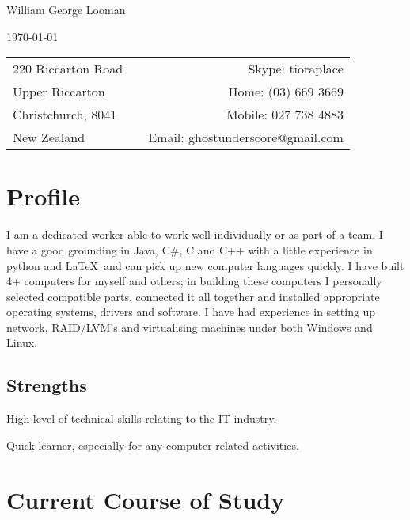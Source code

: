 \documentclass[10pt]{article}
\newenvironment{packed_items}{
    \begin{itemize}
    \setlength{\itemsep}{1pt}
    \setlength{\parskip}{0pt}
    \setlength{\parsep}{0pt}
}{\end{itemize}}
\begin{document}
    \begin{centering}
        {\LARGE William George Looman}
        
        {\today}
        
        {
            \begin{tabularx}{\textwidth}{lXr}
            220 Riccarton Road  &  &                Skype: tioraplace \\
            Upper Riccarton     &  &              Home: (03) 669 3669 \\
            Christchurch, 8041  &  &             Mobile: 027 738 4883 \\
            New Zealand         &  & Email: ghostunderscore@gmail.com \\
            \end{tabularx}
        }
    \end{centering}
    \section*{Profile}\small
    \vspace{-5pt}
        I am a dedicated worker able to work well individually or as part of a team. I have a good grounding in Java, C\#, C and C++ with a little experience in python and \LaTeX\, and can pick up new computer languages quickly. I have built 4+ computers for myself and others; in building these computers I personally selected compatible parts, connected it all together and installed appropriate operating systems, drivers and software. I have had experience in setting up network, RAID/LVM’s and virtualising machines under both Windows and Linux.
    \subsection*{Strengths}
        \begin{packed_items}\small
            \item{High level of technical skills relating to the IT industry.}
            \item{Quick learner, especially for any computer related activities.}
        \end{packed_items}
    \section*{Current Course of Study}
    \vspace{-7pt}
\end{document}
